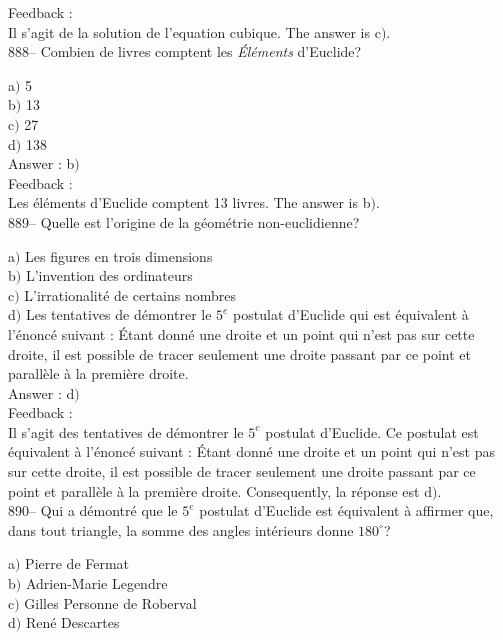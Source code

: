 \documentclass[letterpaper, 12pt]{article}
\begin{document}
Feedback :\\
Il s'agit de la solution de l'equation cubique. The answer is
c$)$.\\

888-- Combien de livres comptent les {\sl \'El\'ements} d'Euclide?

a$)$ 5 \\
b$)$ 13  \\
c$)$ 27 \\
d$)$ 138 \\

Answer : b$)$\\

Feedback : \\
Les \'el\'ements d'Euclide comptent 13 livres. The answer is b$)$.\\

889-- Quelle est l'origine de la g\'eom\'etrie non-euclidienne?

a$)$ Les figures en trois dimensions \\
b$)$ L'invention des ordinateurs  \\
c$)$ L'irrationalit\'e de certains nombres \\
d$)$ Les tentatives de d\'emontrer le $5^e$ postulat d'Euclide qui
est \'equivalent \`a l'\'enonc\'e suivant : \og\'Etant donn\'e une
droite et un point qui n'est pas sur cette droite, il est possible
de tracer seulement une droite passant
par ce point et parall\`ele \`a la premi\`ere droite\fg .\\

Answer : d$)$\\

Feedback : \\
Il s'agit des tentatives de d\'emontrer le $5^e$ postulat d'Euclide.
Ce postulat est \'equivalent \`a l'\'enonc\'e suivant : \og\'Etant
donn\'e une droite et un point qui n'est pas sur cette droite, il
est possible de tracer seulement une droite passant par ce point et
parall\`ele \`a la premi\`ere droite\fg . Consequently, la
r\'eponse est d$)$.\\

890-- Qui a d\'emontr\'e que le $5^e$ postulat d'Euclide est
\'equivalent \`a affirmer que, dans tout triangle, la somme des
angles int\'erieurs donne $180^{\circ}$?

a$)$ Pierre de Fermat \\
b$)$ Adrien-Marie Legendre   \\
c$)$ Gilles Personne de Roberval \\
d$)$ Ren\'e Descartes \\
\end{document}
